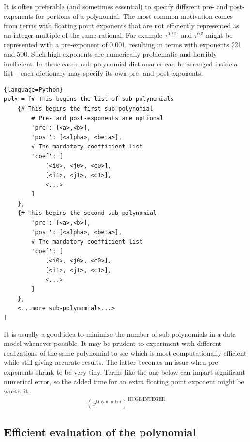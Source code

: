 It is often preferable (and sometimes essential) to specify different pre- and post-exponents for portions of a polynomial.  The most common motivation comes from terms with floating point exponents that are not efficiently represented as an integer multiple of the same rational.  For example $\tau^{0.221}$ and $\tau^{0.5}$ might be represented with a pre-exponent of 0.001, resulting in terms with exponents 221 and 500.  Such high exponents are numerically problematic and horribly inefficient.  In these cases, sub-polynomial dictionaries can be arranged inside a list -- each dictionary may specify its own pre- and post-exponents.  

\begin{lstlisting}{language=Python}
poly = [# This begins the list of sub-polynomials
    {# This begins the first sub-polynomial
        # Pre- and post-exponents are optional
        'pre': [<a>,<b>],       
        'post': [<alpha>, <beta>],
        # The mandatory coefficient list
        'coef': [
            [<i0>, <j0>, <c0>],
            [<i1>, <j1>, <c1>],
            <...>
        ]
    },
    {# This begins the second sub-polynomial
        'pre': [<a>,<b>],       
        'post': [<alpha>, <beta>],
        # The mandatory coefficient list
        'coef': [
            [<i0>, <j0>, <c0>],
            [<i1>, <j1>, <c1>],
            <...>
        ]
    },
    <...more sub-polynomials...>
]
\end{lstlisting}

It is usually a good idea to minimize the number of sub-polynomials in a data model whenever possible.  It may be prudent to experiment with different realizations of the same polynomial to see which is most computationally efficient while still giving accurate results.  The latter becomes an issue when pre-exponents shrink to be very tiny.  Terms like the one below can impart significant numerical error, so the added time for an extra floating point exponent might be worth it.
\begin{align*}
\left(x^\mathrm{tiny\ number}\right)^\mathrm{HUGE\ INTEGER}
\end{align*}

\subsection{Efficient evaluation of the polynomial}

